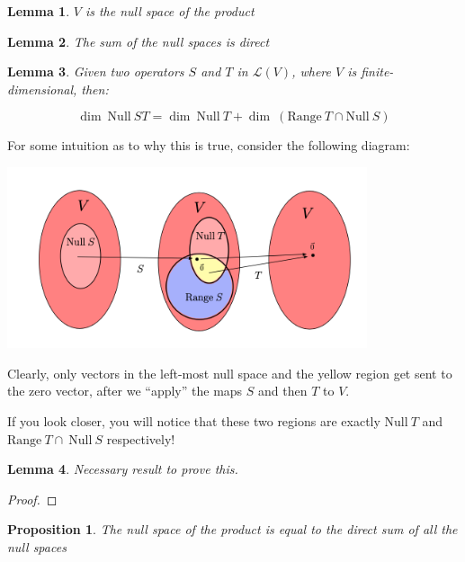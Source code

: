 \documentclass[10pt, oneside]{article}
\newtheorem{lem}{Lemma}
\newtheorem{prop}{Proposition}
\begin{document}
   \begin{lem}
     $V$ is the null space of the product
   \end{lem}

   \begin{lem}
     The sum of the null spaces is direct
     \end{lem}

   \begin{lem}
     Given two operators $S$ and $T$ in $\mathcal{L}(V)$, where $V$ is finite-dimensional, then:

     $$\dim \ \mathrm{Null} \ ST = \dim \ \mathrm{Null} \ T + \dim \ (\mathrm{Range} \ T \cap \mathrm{Null} \ S)$$
   \end{lem}

   For some intuition as to why this is true, consider the following diagram:

   \begin{center}
     \includegraphics[width=300pt]{assets/map.png}
   \end{center}

   Clearly, only vectors in the left-most null space and the yellow region get sent to the zero vector,
   after we ``apply'' the maps $S$ and then $T$ to $V$.
   \newline

   If you look closer, you will notice that
   these two regions are exactly $\text{Null} \ T$ and $\text{Range} \ T \cap \ \text{Null} \ S$ respectively!

   \begin{lem}
     Necessary result to prove this.
     \end{lem}

   \begin{proof}

   \end{proof}

   \begin{prop}
     The null space of the product is equal to the direct sum of all the null spaces
   \end{prop}
\end{document}
